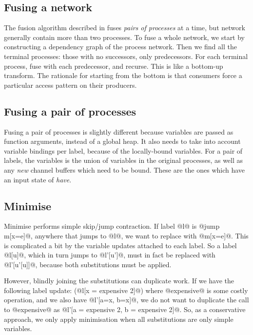 
\subsection{Fusing a network}
The fusion algorithm described in  fuses \emph{pairs of processes} at a time, but network generally contain more than two processes.
To fuse a whole network, we start by constructing a dependency graph of the process network.
Then we find all the terminal processes: those with no successors, only predecessors.
For each terminal process, fuse with each predecessor, and recurse.
This is like a bottom-up transform.
The rationale for starting from the bottom is that consumers force a particular access pattern on their producers.


\subsection{Fusing a pair of processes}
Fusing a pair of processes is slightly different because variables are passed as function arguments, instead of a global heap.
It also needs to take into account variable bindings per label, because of the locally-bound variables.
For a pair of labels, the variables is the union of variables in the original processes, as well as any \emph{new} channel buffers which need to be bound.
These are the ones which have an input state of \emph{have}.

\subsection{Minimise}
Minimise performs simple skip/jump contraction.
If label @l@ is @jump m[x=e]@, anywhere that jumps to @l@, we want to replace with @m[x=e]@.
This is complicated a bit by the variable updates attached to each label.
So a label @l[u]@, which in turn jumps to @l'[u']@, must in fact be replaced with @l'[u'[u]]@, because both substitutions must be applied.

However, blindly joining the substitutions can duplicate work.
If we have the following label update: (@l[x = expensive 2]@) where @expensive@ is some costly operation, and we also have @l'[a=x, b=x]@, we do not want to duplicate the call to @expensive@ as @l'[a = expensive 2, b = expensive 2]@.
So, as a conservative approach, we only apply minimisation when all substitutions are only simple variables.

